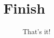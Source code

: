 \chapter{Finish}
\label{appendix:finish}

\vfill
\begin{figure}[h]
	\resizebox{\textwidth}{!}{%
	}
	\caption{That's it!}
\end{figure}
\vfill
